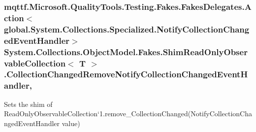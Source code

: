 \hypertarget{class_system_1_1_collections_1_1_object_model_1_1_fakes_1_1_shim_read_only_observable_collection_3_01_t_01_4_acd16a83703e7abd470464c8914d64e99}{
\subsubsection[{Collection\-Changed\-Remove\-Notify\-Collection\-Changed\-Event\-Handler}]{\setlength{\rightskip}{0pt plus 5cm}mqttf.\-Microsoft.\-Quality\-Tools.\-Testing.\-Fakes.\-Fakes\-Delegates.\-Action$<$global.\-System.\-Collections.\-Specialized.\-Notify\-Collection\-Changed\-Event\-Handler$>$ System.\-Collections.\-Object\-Model.\-Fakes.\-Shim\-Read\-Only\-Observable\-Collection$<$ T $>$.Collection\-Changed\-Remove\-Notify\-Collection\-Changed\-Event\-Handler\hspace{0.3cm}{\ttfamily [set]}, {\ttfamily [remove]}}}\label{class_system_1_1_collections_1_1_object_model_1_1_fakes_1_1_shim_read_only_observable_collection_3_01_t_01_4_acd16a83703e7abd470464c8914d64e99}


Sets the shim of Read\-Only\-Observable\-Collection`1.remove\-\_\-\-Collection\-Changed(\-Notify\-Collection\-Changed\-Event\-Handler value)

